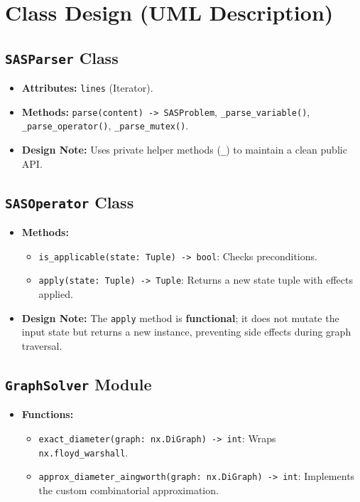 \documentclass[12pt,a4paper]{report}
\begin{document}
\section{Class Design (UML Description)}

\subsection{\texttt{SASParser} Class}
\begin{itemize}
    \item \textbf{Attributes:} \texttt{lines} (Iterator).
    \item \textbf{Methods:} \texttt{parse(content) -> SASProblem}, \texttt{\_parse\_variable()}, \texttt{\_parse\_operator()}, \texttt{\_parse\_mutex()}.
    \item \textbf{Design Note:} Uses private helper methods (\texttt{\_}) to maintain a clean public API.
\end{itemize}

\subsection{\texttt{SASOperator} Class}
\begin{itemize}
    \item \textbf{Methods:}
    \begin{itemize}
        \item \texttt{is\_applicable(state: Tuple) -> bool}: Checks preconditions.
        \item \texttt{apply(state: Tuple) -> Tuple}: Returns a new state tuple with effects applied.
    \end{itemize}
    \item \textbf{Design Note:} The \texttt{apply} method is \textbf{functional}; it does not mutate the input state but returns a new instance, preventing side effects during graph traversal.
\end{itemize}

\subsection{\texttt{GraphSolver} Module}
\begin{itemize}
    \item \textbf{Functions:}
    \begin{itemize}
        \item \texttt{exact\_diameter(graph: nx.DiGraph) -> int}: Wraps \texttt{nx.floyd\_warshall}.
        \item \texttt{approx\_diameter\_aingworth(graph: nx.DiGraph) -> int}: Implements the custom combinatorial approximation.
    \end{itemize}
\end{itemize}
\end{document}
